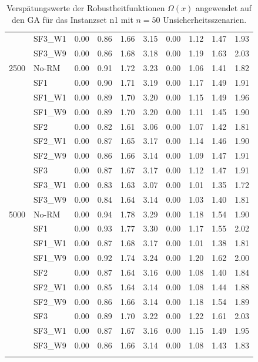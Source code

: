 {\begin{longtable}{ll|rrrr|rrrr}
     & SF3\_W1 & 0.00 & 0.86 & 1.66 & 3.15 & 0.00 & 1.12 & 1.47 & 1.93 \\
     & SF3\_W9 & 0.00 & 0.86 & 1.68 & 3.18 & 0.00 & 1.19 & 1.63 & 2.03 \\ \hline
2500 & No-RM & 0.00 & 0.91 & 1.72 & 3.23 & 0.00 & 1.06 & 1.41 & 1.82 \\
     & SF1 & 0.00 & 0.90 & 1.71 & 3.19 & 0.00 & 1.17 & 1.49 & 1.91 \\
     & SF1\_W1 & 0.00 & 0.89 & 1.70 & 3.20 & 0.00 & 1.15 & 1.49 & 1.96 \\
     & SF1\_W9 & 0.00 & 0.89 & 1.70 & 3.20 & 0.00 & 1.11 & 1.45 & 1.90 \\
     & SF2 & 0.00 & 0.82 & 1.61 & 3.06 & 0.00 & 1.07 & 1.42 & 1.81 \\
     & SF2\_W1 & 0.00 & 0.87 & 1.65 & 3.17 & 0.00 & 1.14 & 1.46 & 1.90 \\
     & SF2\_W9 & 0.00 & 0.86 & 1.66 & 3.14 & 0.00 & 1.09 & 1.47 & 1.91 \\
     & SF3 & 0.00 & 0.87 & 1.67 & 3.17 & 0.00 & 1.12 & 1.47 & 1.91 \\
     & SF3\_W1 & 0.00 & 0.83 & 1.63 & 3.07 & 0.00 & 1.01 & 1.35 & 1.72 \\
     & SF3\_W9 & 0.00 & 0.84 & 1.64 & 3.14 & 0.00 & 1.03 & 1.40 & 1.81 \\ \hline
5000 & No-RM & 0.00 & 0.94 & 1.78 & 3.29 & 0.00 & 1.18 & 1.54 & 1.90 \\
     & SF1 & 0.00 & 0.93 & 1.77 & 3.30 & 0.00 & 1.17 & 1.55 & 2.02 \\
     & SF1\_W1 & 0.00 & 0.87 & 1.68 & 3.17 & 0.00 & 1.01 & 1.38 & 1.81 \\
     & SF1\_W9 & 0.00 & 0.92 & 1.74 & 3.24 & 0.00 & 1.20 & 1.62 & 2.00 \\
     & SF2 & 0.00 & 0.87 & 1.64 & 3.16 & 0.00 & 1.08 & 1.40 & 1.84 \\
     & SF2\_W1 & 0.00 & 0.85 & 1.64 & 3.14 & 0.00 & 1.08 & 1.44 & 1.88 \\
     & SF2\_W9 & 0.00 & 0.86 & 1.66 & 3.14 & 0.00 & 1.18 & 1.54 & 1.89 \\
     & SF3 & 0.00 & 0.89 & 1.70 & 3.22 & 0.00 & 1.22 & 1.61 & 2.03 \\
     & SF3\_W1 & 0.00 & 0.87 & 1.67 & 3.16 & 0.00 & 1.15 & 1.49 & 1.95 \\
     & SF3\_W9 & 0.00 & 0.86 & 1.66 & 3.14 & 0.00 & 1.08 & 1.43 & 1.83 \\
\bottomrule
\caption{Verspätungswerte der Robustheitfunktionen $\Omega(x)$ angewendet auf den \ac{GA} für das Instanzset n1 mit $n = 50$ Unsicherheitsszenarien. }
\label{tab:evaluation_robustness_n1_ga}
\end{longtable}
}
\vspace*{-25px}
\begin{figure}[H]
\end{figure}

